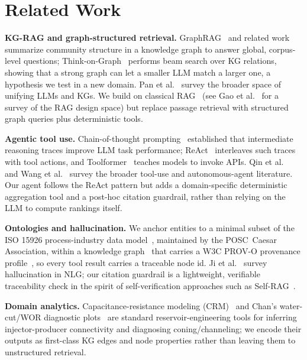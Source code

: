\documentclass{article}
\begin{document}
\section{Related Work}

\textbf{KG-RAG and graph-structured retrieval.} GraphRAG~\cite{edge2024graphrag}
and related work~\cite{sanmartin2024kgrag} summarize community structure in a
knowledge graph to answer global, corpus-level questions; Think-on-Graph~\cite{sun2024tog}
performs beam search over KG relations, showing that a strong graph can let a
smaller LLM match a larger one, a hypothesis we test in a new domain.
Pan et al.~\cite{pan2024roadmap} survey the broader space of unifying LLMs and
KGs. We build on classical RAG~\cite{lewis2020rag} (see Gao
et al.~\cite{ragsurvey2023} for a survey of the RAG design space) but replace
passage retrieval with structured graph queries plus deterministic tools.

\textbf{Agentic tool use.} Chain-of-thought prompting~\cite{cot2022}
established that intermediate reasoning traces improve LLM task performance;
ReAct~\cite{yao2023react} interleaves such traces with tool actions, and
Toolformer~\cite{schick2023toolformer} teaches models to invoke APIs. Qin et
al.~\cite{toollearning2023} and Wang et al.~\cite{llmagents2024} survey the
broader tool-use and autonomous-agent literature. Our agent follows the ReAct
pattern but adds a domain-specific deterministic aggregation tool and a
post-hoc citation guardrail, rather than relying on the LLM to compute
rankings itself.

\textbf{Ontologies and hallucination.} We anchor entities to a minimal subset
of the ISO 15926 process-industry data model~\cite{iso15926}, maintained by the
POSC~Caesar Association, within a knowledge graph~\cite{hogan2021kgsurvey} that
carries a W3C PROV-O provenance profile~\cite{provo2013}, so every tool result
carries a traceable node id. Ji et al.~\cite{ji2023hallucination} survey
hallucination in NLG; our citation guardrail is a lightweight, verifiable
traceability check in the spirit of self-verification approaches such as
Self-RAG~\cite{selfrag2024}.

\textbf{Domain analytics.} Capacitance-resistance modeling
(CRM)~\cite{yousef2006crm,sayarpour2009} and Chan's water-cut/WOR diagnostic
plots~\cite{chan1995wor} are standard reservoir-engineering tools for inferring
injector-producer connectivity and diagnosing coning/channeling; we encode
their outputs as first-class KG edges and node properties rather than leaving
them to unstructured retrieval.
\end{document}
